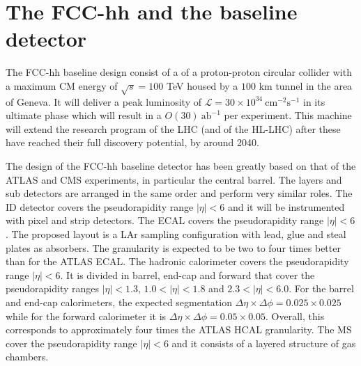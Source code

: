 
\section{The FCC-hh and the baseline detector}
\label{sec:detFCC}
 
The FCC-hh baseline design consist of a of a proton-proton circular collider with a maximum CM energy of $\sqrt{s}=100$ TeV housed by a $100$ km tunnel in the area of Geneva. It will deliver a peak luminosity of $\mathcal{L}=30\times 10^{34}~\text{cm}^{-2}\text{s}^{-1}$ in its ultimate phase which will result in a $O(30)~\text{ab}^{-1}$ per experiment. This machine will extend the research program of the LHC (and of the HL-LHC) after these have reached their full discovery potential, by around 2040.

The design of the FCC-hh baseline detector has been greatly based on that of the ATLAS and CMS experiments, in particular the central barrel. The layers and sub detectors are arranged in the same order and perform very similar roles. The ID detector covers the pseudorapidity range $|\eta|<6$ and it will be instrumented with pixel and strip detectors. The ECAL covers the pseudorapidity range $|\eta|<6$. The proposed layout is a LAr sampling configuration with lead, glue and steal plates as absorbers. The granularity is expected to be two to four times better than for the ATLAS ECAL. The hadronic calorimeter covers the pseudorapidity range $|\eta| < 6$. It is divided in barrel, end-cap and forward that cover the pseudorapidity ranges $|\eta| < 1.3$, $1.0 < |\eta| < 1.8$ and $2.3 < |\eta| < 6.0$. For the barrel and end-cap calorimeters, the expected segmentation $\Delta\eta\times\Delta\phi = 0.025 \times 0.025$ while for the forward calorimeter it is $\Delta\eta\times\Delta\phi = 0.05 \times 0.05$. Overall, this corresponds to approximately four times the ATLAS HCAL granularity. The MS cover the pseudorapidity range $|\eta|<6$ and it consists of a layered structure of gas chambers.